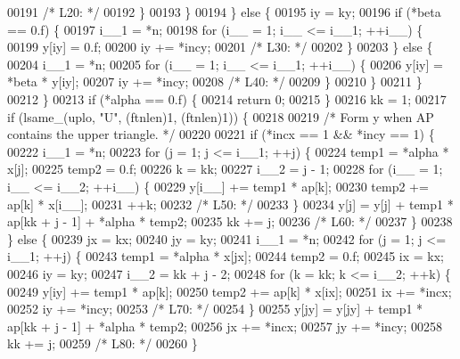 \begin{DoxyCode}
00191 \textcolor{comment}{/* L20: */}
00192         \}
00193         \}
00194     \} \textcolor{keywordflow}{else} \{
00195         iy = ky;
00196         \textcolor{keywordflow}{if} (*beta == 0.f) \{
00197         i\_\_1 = *n;
00198         \textcolor{keywordflow}{for} (i\_\_ = 1; i\_\_ <= i\_\_1; ++i\_\_) \{
00199             y[iy] = 0.f;
00200             iy += *incy;
00201 \textcolor{comment}{/* L30: */}
00202         \}
00203         \} \textcolor{keywordflow}{else} \{
00204         i\_\_1 = *n;
00205         \textcolor{keywordflow}{for} (i\_\_ = 1; i\_\_ <= i\_\_1; ++i\_\_) \{
00206             y[iy] = *beta * y[iy];
00207             iy += *incy;
00208 \textcolor{comment}{/* L40: */}
00209         \}
00210         \}
00211     \}
00212     \}
00213     \textcolor{keywordflow}{if} (*alpha == 0.f) \{
00214     \textcolor{keywordflow}{return} 0;
00215     \}
00216     kk = 1;
00217     \textcolor{keywordflow}{if} (lsame\_(uplo, \textcolor{stringliteral}{"U"}, (ftnlen)1, (ftnlen)1)) \{
00218 
00219 \textcolor{comment}{/*        Form  y  when AP contains the upper triangle. */}
00220 
00221     \textcolor{keywordflow}{if} (*incx == 1 && *incy == 1) \{
00222         i\_\_1 = *n;
00223         \textcolor{keywordflow}{for} (j = 1; j <= i\_\_1; ++j) \{
00224         temp1 = *alpha * x[j];
00225         temp2 = 0.f;
00226         k = kk;
00227         i\_\_2 = j - 1;
00228         \textcolor{keywordflow}{for} (i\_\_ = 1; i\_\_ <= i\_\_2; ++i\_\_) \{
00229             y[i\_\_] += temp1 * ap[k];
00230             temp2 += ap[k] * x[i\_\_];
00231             ++k;
00232 \textcolor{comment}{/* L50: */}
00233         \}
00234         y[j] = y[j] + temp1 * ap[kk + j - 1] + *alpha * temp2;
00235         kk += j;
00236 \textcolor{comment}{/* L60: */}
00237         \}
00238     \} \textcolor{keywordflow}{else} \{
00239         jx = kx;
00240         jy = ky;
00241         i\_\_1 = *n;
00242         \textcolor{keywordflow}{for} (j = 1; j <= i\_\_1; ++j) \{
00243         temp1 = *alpha * x[jx];
00244         temp2 = 0.f;
00245         ix = kx;
00246         iy = ky;
00247         i\_\_2 = kk + j - 2;
00248         \textcolor{keywordflow}{for} (k = kk; k <= i\_\_2; ++k) \{
00249             y[iy] += temp1 * ap[k];
00250             temp2 += ap[k] * x[ix];
00251             ix += *incx;
00252             iy += *incy;
00253 \textcolor{comment}{/* L70: */}
00254         \}
00255         y[jy] = y[jy] + temp1 * ap[kk + j - 1] + *alpha * temp2;
00256         jx += *incx;
00257         jy += *incy;
00258         kk += j;
00259 \textcolor{comment}{/* L80: */}
00260         \}

\end{DoxyCode}
